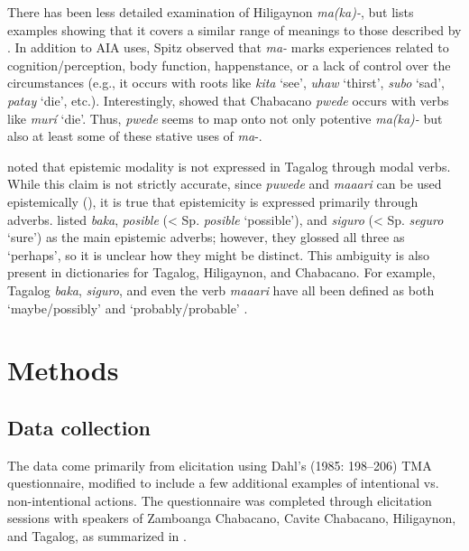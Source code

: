 \documentclass[output=paper,colorlinks,citecolor=brown]{langscibook}
\begin{document}
There has been less detailed examination of Hiligaynon \textit{ma(ka)-}, but \citet[383--384]{Spitz2002} lists examples showing that it covers a similar range of meanings to those described by \citet{Himmelmann2006}. In addition to AIA uses, Spitz observed that \textit{ma-} marks experiences related to cognition/perception, body function, happenstance, or a lack of control over the circumstances (e.g., it occurs with roots like \textit{kita} ‘see’, \textit{uhaw} ‘thirst’, \textit{subo} ‘sad’, \textit{patay} ‘die’, etc.). Interestingly, \citet[292]{Rubino2008} showed that Chabacano \textit{pwede} occurs with verbs like \textit{murí} ‘die’. Thus, \textit{pwede} seems to map onto not only potentive \textit{ma(ka)-} but also at least some of these stative uses of \textit{ma}{}-.

\citet{AsarinaHolt2005} noted that epistemic modality is not expressed in Tagalog through modal verbs. While this claim is not strictly accurate, since \textit{puwede} and \textit{maaari} can be used epistemically (\citealt{SchachterOtanes1972}), it is true that epistemicity is expressed primarily through adverbs. \citet{BaderWymann1994} listed \textit{baka}, \textit{posible} (< Sp. \textit{posible} ‘possible’), and \textit{siguro} (< Sp. \textit{seguro} ‘sure’) as the main epistemic adverbs; however, they glossed all three as ‘perhaps’, so it is unclear how they might be distinct. This ambiguity is also present in dictionaries for Tagalog, Hiligaynon, and Chabacano. For example, Tagalog \textit{baka}, \textit{siguro}, and even the verb \textit{maaari} have all been defined as both ‘maybe/possibly’ and ‘probably/probable’ \citep[785]{English2008}.

\section{Methods}
\subsection{Data collection}

The data come primarily from elicitation using Dahl's (1985: 198–206) TMA questionnaire, modified to include a few additional examples of intentional vs. non-intentional actions. The questionnaire was completed through elicitation sessions with speakers of Zamboanga Chabacano, Cavite Chabacano, Hiligaynon, and Tagalog, as summarized in .
\end{document}
